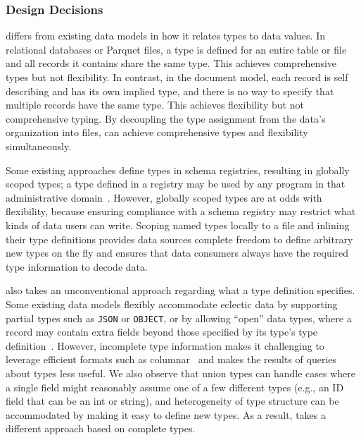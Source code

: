 \subsubsection{Design Decisions} 

\sys{} differs from existing data models in how it relates types to data values. In relational databases or Parquet files, a type is defined for an entire table or file and all records it contains share the same type. This achieves comprehensive types but not flexibility. In contrast, in the document model, each record is self describing and has its own implied type, and there is no way to specify that multiple records have the same type. This achieves flexibility but not comprehensive typing. By decoupling the type assignment from the data's organization into files, \sys{} can achieve comprehensive types and flexibility simultaneously.

Some existing approaches define types in schema registries, resulting in globally scoped types; a type defined in a registry may be used by any program in that administrative domain~\cite{confluent_schema_registry}. However, globally scoped types are at odds with  flexibility, because ensuring compliance with a schema registry may restrict what kinds of data users can write. Scoping named types locally to a file and inlining their type definitions provides data sources complete freedom to define arbitrary new types on the fly and ensures that data consumers always have the required type information to decode data.

\sys{} also takes an unconventional approach regarding what a type definition specifies. Some existing data models flexibly accommodate eclectic data by supporting partial types such as \texttt{JSON} or \texttt{OBJECT}, or by allowing ``open'' data types, where a record may contain extra fields beyond those specified by its type's type definition~\cite{asterixdb, json_schema, xml_schema}. However, incomplete type information makes it challenging to leverage efficient formats such as columnar~\cite{snowflake} and makes the results of queries about types less useful. We also observe that union types can handle cases where a single field might reasonably assume one of a few different types (e.g., an ID field that can be an int or string), and heterogeneity of type structure can be accommodated by making it easy to define new types. As a result, \sys{} takes a different approach based on complete types.

